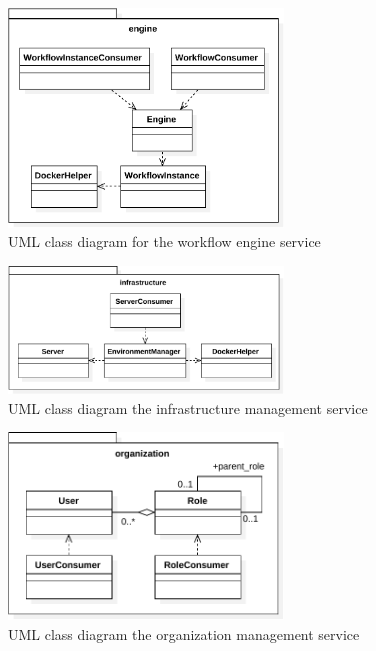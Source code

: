   \begin{figure}[htbp]
    \centering
    \includegraphics[width=0.65\textwidth]{content/images/class_diagram_engine-crop.pdf}
    \caption{UML class diagram for the workflow engine service}
    \label{fig:class_diagram_engine}
  \end{figure}

  \begin{figure}[htbp]
    \centering
    \includegraphics[width=0.65\textwidth]{content/images/class_diagram_infrastructure-crop.pdf}
    \caption{UML class diagram the infrastructure management service}
    \label{fig:class_diagram_infrastructure}
  \end{figure}

  \begin{figure}[htbp]
    \centering
    \includegraphics[width=0.65\textwidth]{content/images/class_diagram_organization-crop.pdf}
    \caption{UML class diagram the organization management service}
    \label{fig:class_diagram_organization}
  \end{figure}

